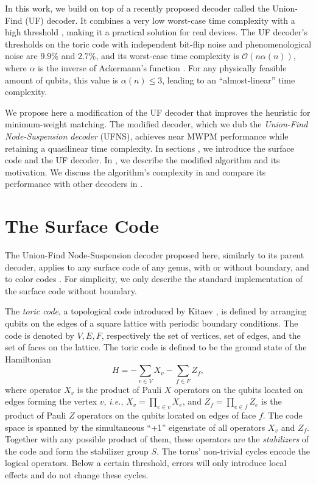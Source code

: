 In this work, we build on top of a recently proposed decoder called the Union-Find (UF) decoder. It combines a very low worst-case time complexity with a high threshold \cite{delfosse2017almost}, making it a practical solution for real devices. The UF decoder's thresholds on the toric code with independent bit-flip noise and phenomenological noise are $9.9\%$ and $2.7\%$, and its worst-case time complexity is $\mathcal{O}(n\alpha(n))$, where $\alpha$ is the inverse of Ackermann's function \cite{tarjan1975efficiency}. For any physically feasible amount of qubits, this value is $\alpha(n) \leq 3$, leading to an ``almost-linear'' time complexity.

We propose here a modification of the UF decoder that improves the heuristic for minimum-weight matching. The modified decoder, which we dub the \emph{Union-Find Node-Suspension decoder} (UFNS), achieves near MWPM performance while retaining a quasilinear time complexity. In sections , we introduce the surface code and the UF decoder. In , we describe the modified algorithm and its motivation. We discuss the algorithm's complexity in  and compare its performance with other decoders in .  

\section{The Surface Code}\label{sec:surfacecode}

The Union-Find Node-Suspension decoder proposed here, similarly to its parent decoder, applies to any surface code of any genus, with or without boundary, and to color codes \cite{delfosse2017almost}. For simplicity, we only describe the standard implementation of the surface code without boundary.

The \emph{toric code}, a topological code introduced by Kitaev \cite{kitaev2003fault}, is defined by arranging qubits on the edges of a square lattice with periodic boundary conditions. The code is denoted by $V,E,F$, respectively the set of vertices, set of edges, and the set of faces on the lattice. The toric code is defined to be the ground state of the Hamiltonian 
\begin{equation}
    H = -\sum_{v \in V} X_v -\sum_{f \in F} Z_f, 
\end{equation}
where operator $X_v$ is the product of Pauli $X$ operators on the qubits located on edges forming the vertex $v$, \emph{i.e.}, $X_v = \prod_{e \in v} X_e$, and $Z_f = \prod_{e \in f} Z_e$ is the product of Pauli $Z$ operators on the qubits located on edges of face $f$. The code space is spanned by the simultaneous ``+1'' eigenstate of all operators $X_v$ and $Z_f$. Together with any possible product of them, these operators are the \emph{stabilizers} of the code and form the stabilizer group $S$. The torus' non-trivial cycles encode the logical operators. Below a certain threshold, errors will only introduce local effects and do not change these cycles.

